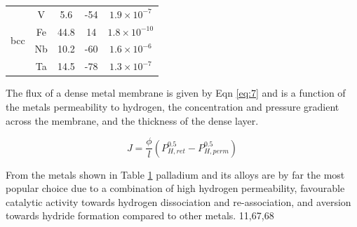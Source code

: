 \begin{table}[htbp]
{\begin{tabular}{@{}ccccc@{}}
    \multirow{4}{*}{bcc} & V                          & 5.6                                                                                              & -54                                                                              & $1.9\times 10^{-7}$                                                                                       \\
                         & Fe                         & 44.8                                                                                             & 14                                                                               & $1.8\times 10^{-10}$                                                                                      \\
                         & Nb                         & 10.2                                                                                             & -60                                                                              & $1.6\times 10^{-6}$                                                                                       \\
                         & Ta                         & 14.5                                                                                             & -78                                                                              & $1.3\times 10^{-7}$                                                                                       \\ \bottomrule
    \end{tabular}}\label{tb:2}
    \end{table}

The flux of a dense metal membrane is given by Eqn \ref{eq:7} and is a function of the metals 
permeability to hydrogen, the concentration and pressure gradient across the membrane, and 
the thickness of the dense layer. 

\begin{equation}\label{eq:7}
    J=\frac{\phi}{l} (P_{H,ret}^{0.5} - P_{H,perm}^{0.5})
\end{equation}

From the metals shown in Table \ref{tb:2} palladium and its alloys are by far the most 
popular choice due to a combination of high hydrogen permeability, favourable catalytic 
activity towards hydrogen dissociation and re-association, and aversion towards hydride 
formation compared to other metals. 11,67,68  

